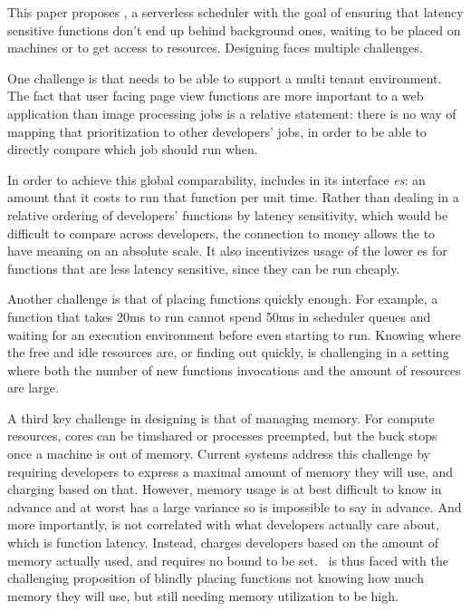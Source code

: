 This paper proposes \sys{}, a serverless scheduler with the goal of ensuring
that latency sensitive functions don't end up behind background ones, waiting to
be placed on machines or to get access to resources. Designing \sys{} faces
multiple challenges. 

One challenge is that \sys{} needs to be able to support a multi tenant
environment. The fact that user facing page view functions are more important to
a web application than image processing jobs is a relative statement: there is
no way of mapping that prioritization to other developers' jobs, in order to be
able to directly compare which job should run when. 


In order to achieve this global comparability, \sys{} includes in its interface
\emph{\priceclass{}es}: an amount that it costs to run that function per unit
time. Rather than dealing in a relative ordering of developers' functions by
latency sensitivity, which would be difficult to compare across developers, the
connection to money allows the \class{} to have meaning on an absolute scale. It
also incentivizes usage of the lower \class{}es for functions that are less
latency sensitive, since they can be run cheaply.


Another challenge is that of placing functions quickly enough. For example,
a function that takes 20ms to run cannot spend 50ms in scheduler queues and
waiting for an execution environment before even starting to run. Knowing where
the free and idle resources are, or finding out quickly, is challenging in a
setting where both the number of new functions invocations and the amount of
resources are large.


A third key challenge in designing \sys{} is that of managing memory. For
compute resources, cores can be timshared or processes preempted, but the buck
stops once a machine is out of memory. Current systems address this challenge by
requiring developers to express a maximal amount of memory they will use, and
charging based on that. However, memory usage is at best difficult to know in
advance and at worst has a large variance so is impossible to say in advance.
And more importantly, is not correlated with what developers actually care
about, which is function latency. Instead, \sys{} charges developers based on
the amount of memory actually used, and requires no bound to be set.~\Sys{} is
thus faced with the challenging proposition of blindly placing functions not
knowing how much memory they will use, but still needing memory utilization to
be high.
 
